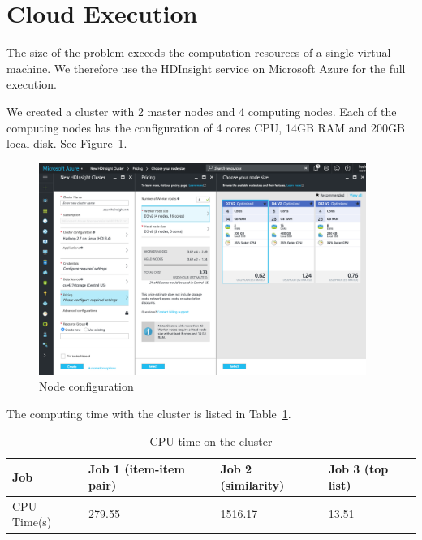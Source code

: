\section{Cloud Execution}
The size of the problem exceeds the computation resources of a single
virtual machine. We therefore use the HDInsight service on Microsoft
Azure for the full execution.

We created a cluster with 2 master nodes and 4 computing nodes. Each of
the computing nodes has the configuration of 4 cores CPU, 14GB RAM and
200GB local disk. See Figure~\ref{fig:node}.
\begin{figure}[!ht]
  \centering
  \includegraphics[width=0.95\textwidth]{images/node}
  \caption{Node configuration}
  \label{fig:node}
\end{figure}

The computing time with the cluster is listed in Table~\ref{tab:clustertime}.
\begin{table}[!ht]
  \centering
  \begin{tabular}{|p{2.5cm}|p{4cm}|p{3cm}|p{3cm}|}
    \hline
    Job & Job 1 (item-item pair) & Job 2 (similarity) & Job 3 (top list)\\
    \hline
    CPU Time(s) & 279.55 & 1516.17 & 13.51\\
    \hline
  \end{tabular}
  \caption{CPU time on the cluster}
  \label{tab:clustertime}
\end{table}
